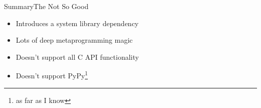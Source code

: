 \documentclass{beamer}
\begin{document}
\begin{frame}[<+->]{Summary}{The Not So Good}
  \begin{itemize}
    \item Introduces a system library dependency
    \item Lots of deep metaprogramming magic
    \item Doesn't support all C API functionality
    \item Doesn't support PyPy\footnote{as far as I know}
  \end{itemize}
\end{frame}
\end{document}
